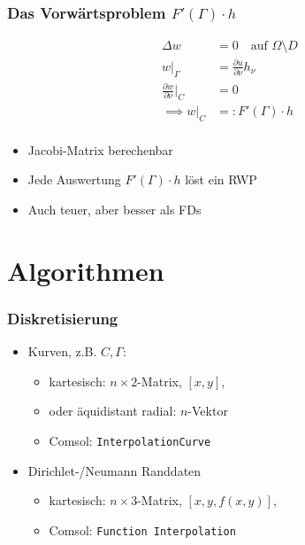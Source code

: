 \documentclass{beamer}
\begin{document}
\begin{frame}
	\frametitle{Das Vorwärtsproblem $F'(\Gamma) \cdot h$}
	\begin{minipage}{0.5\textwidth}
		\begin{align*}
			\Delta w &= 0 \quad \text{auf $\Omega \setminus D$} \\
			w|_\Gamma &= \tfrac{\partial u}{\partial \nu} h_\nu \\
			\tfrac{\partial w}{\partial \nu}|_C &= 0 \\
			\implies w|_C &=: F'(\Gamma) \cdot h \\
		\end{align*}
	\end{minipage}
	\begin{minipage}{0.48\textwidth}
		\begin{itemize}
			\item \pause
				Jacobi-Matrix berechenbar
			\item \pause
				Jede Auswertung $F'(\Gamma)\cdot h$ löst ein RWP
			\item
				Auch teuer, aber besser als FDs
		\end{itemize}
	\end{minipage}
\end{frame}

\section{Algorithmen}

\begin{frame}
	\frametitle{Diskretisierung}
	\begin{itemize}
		\item \pause
			Kurven, z.B. $C, \Gamma$:
			\begin{itemize}
				\item
					kartesisch: $n\times 2$-Matrix, $[x,y]$,
				\item
					oder äquidistant radial: $n$-Vektor
				\item
					Comsol: \texttt{InterpolationCurve}
			\end{itemize}
		\item \pause
			Dirichlet-/Neumann Randdaten
			\begin{itemize}
				\item
					kartesisch: $n\times 3$-Matrix, $[x,y,f(x,y)]$,
				\item
					Comsol: \texttt{Function Interpolation}
			\end{itemize}
	\end{itemize}
\end{frame}
\end{document}
